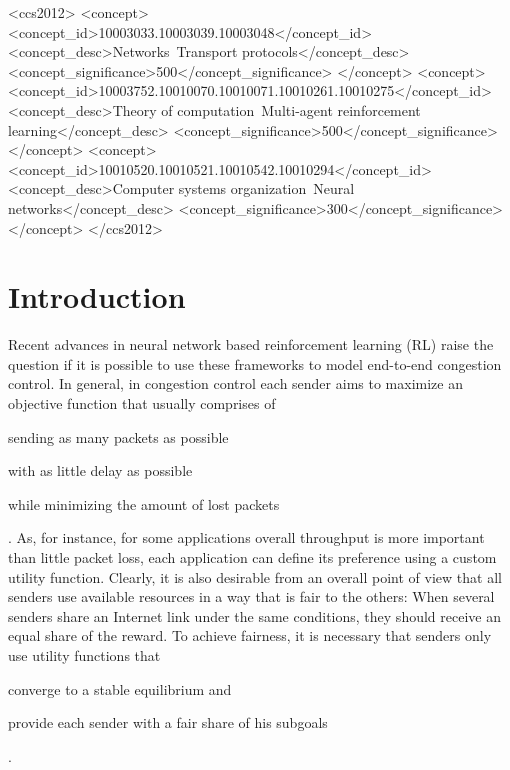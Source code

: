 \documentclass[sigconf]{acmart}
\begin{document}
%
%
\begin{CCSXML}
<ccs2012>
<concept>
<concept_id>10003033.10003039.10003048</concept_id>
<concept_desc>Networks~Transport protocols</concept_desc>
<concept_significance>500</concept_significance>
</concept>
<concept>
<concept_id>10003752.10010070.10010071.10010261.10010275</concept_id>
<concept_desc>Theory of computation~Multi-agent reinforcement learning</concept_desc>
<concept_significance>500</concept_significance>
</concept>
<concept>
<concept_id>10010520.10010521.10010542.10010294</concept_id>
<concept_desc>Computer systems organization~Neural networks</concept_desc>
<concept_significance>300</concept_significance>
</concept>
</ccs2012>
\end{CCSXML}




\maketitle%

\section{Introduction}

Recent advances in neural network based reinforcement learning (RL) raise the question if it is possible to use these frameworks to model end-to-end congestion control. In general, in congestion control each sender aims to maximize an objective function that usually comprises of
\begin{enumerate*}
\item sending as many packets as possible
\item with as little delay as possible
\item while minimizing the amount of lost packets
\end{enumerate*}. As, for instance, for some applications overall throughput is more important than little packet loss, each application can define its preference using a custom utility function. Clearly, it is also desirable from an overall point of view that all senders use available resources in a way that is fair to the others: When several senders share an Internet link under the same conditions, they should receive an equal share of the reward. To achieve fairness, it is necessary that senders only use utility functions that 
\begin{enumerate*}
\item converge to a stable equilibrium and
\item provide each sender with a fair share of his subgoals
\end{enumerate*}. 
\end{document}

